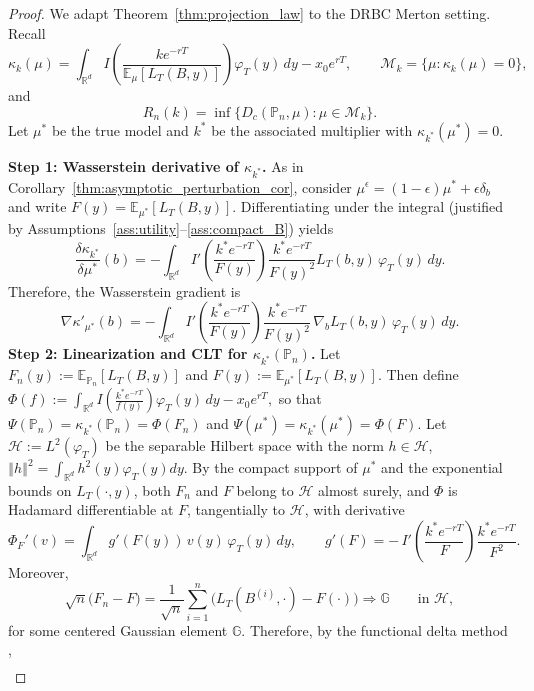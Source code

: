 \documentclass[11pt]{article}
\theoremstyle{definition}
\newcommand{\R}{\mathbb{R}}
\newcommand{\E}{\mathbb{E}}
\begin{document}
\begin{proof}
We adapt Theorem~\ref{thm:projection_law} to the DRBC Merton setting.  
Recall
\[
\kappa_k(\mu)
= \int_{\R^d} I\!\left(\frac{k e^{-rT}}{\E_{\mu}[L_T(B,y)]}\right)\varphi_T(y)\,dy
- x_0 e^{rT},
\qquad 
\mathcal{M}_k = \{\mu:\kappa_k(\mu)=0\},
\]
and
\[
R_n(k)=\inf\{D_c(\mathbb{P}_n,\mu):\mu \in\mathcal{M}_k\}.
\]
Let $\mu^*$ be the true model and $k^*$ be the associated multiplier with 
$\kappa_{k^*}(\mu^*)=0$.

\medskip
\noindent\textbf{Step 1: Wasserstein derivative of $\kappa_{k^*}$.}
As in Corollary~\ref{thm:asymptotic_perturbation_cor}, consider {$\mu^\epsilon=(1-\epsilon)\mu^*+\epsilon\delta_b$} and write 
$F(y)=\E_{\mu^*}[L_T(B,y)]$.  
Differentiating under the integral (justified by Assumptions~\ref{ass:utility}--\ref{ass:compact_B}) yields
\[
\frac{\delta\kappa_{k^*}}{\delta\mu^*}(b)
=
-\int_{\R^d} 
I'\!\left(\frac{k^* e^{-rT}}{F(y)}\right)
\frac{k^* e^{-rT}}{F(y)^2}
L_T(b,y)\,\varphi_T(y)\,dy.
\]
Therefore, the Wasserstein gradient is
\begin{equation}\label{eq:kappa_grad_final_camera}
\nabla\kappa'_{\mu^*}(b)
=
-\int_{\R^d} 
I'\!\left(\frac{k^* e^{-rT}}{F(y)}\right)
\frac{k^* e^{-rT}}{F(y)^2}\,
\nabla_b L_T(b,y)\,\varphi_T(y)\,dy.
\end{equation}
\medskip
\noindent\textbf{Step 2: Linearization and CLT for $\kappa_{k^*}(\mathbb P_n)$.}
{
Let $F_n(y):=\mathbb E_{\mathbb P_n}[L_T(B,y)]$ and $F(y):=\mathbb E_{\mu^*}[L_T(B,y)]$. Then 
define $\Phi(f)
:=
\int_{\mathbb R^d}
I\!\left(\frac{k^*e^{-rT}}{f(y)}\right)\varphi_T(y)\,dy
-
x_0e^{rT},$
so that $\Psi(\mathbb P_n)=\kappa_{k^*}(\mathbb P_n)=\Phi(F_n)$ and $\Psi(\mu^*)=\kappa_{k^*}(\mu^*)=\Phi(F).$
Let $\mathcal{H}:= L^2(\varphi_T)$ be the separable Hilbert space with the norm $h \in \mathcal{H}$, $\left \Vert h \right\Vert^2 = \int_{\mathbb{R}^d}h^2(y)\varphi_T(y)dy$. By the compact support of $\mu^*$ and the exponential bounds on $L_T(\cdot,y)$, both $F_n$ and $F$ belong to $\mathcal H$ almost surely, and $\Phi$ is Hadamard differentiable at $F$, tangentially to $\mathcal H$, with derivative
\[
\Phi_F'(v)
=
\int_{\mathbb R^d}
g'(F(y))\,v(y)\,\varphi_T(y)\,dy,
\qquad 
g'(F)
=
-\,I'\!\left(\frac{k^* e^{-rT}}{F}\right)\frac{k^* e^{-rT}}{F^2}.
\]
Moreover,
\[
\sqrt n\big(F_n-F\big)
=
\frac{1}{\sqrt n}\sum_{i=1}^n
\Big(L_T(B^{(i)},\cdot)-F(\cdot)\Big)
\Rightarrow \mathbb G
\qquad\text{in }\mathcal H,
\]
for some centered Gaussian element $\mathbb G$. Therefore, by the functional delta method
\cite{shapiro2009stochastic},
\begin{align*}

\end{align*}}
\end{proof}
\end{document}

